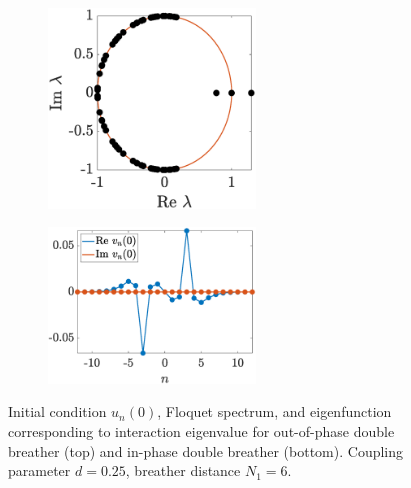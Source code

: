 \documentclass[12pt,reqno]{amsart}
\theoremstyle{definition}
\begin{document}
\begin{figure}
\begin{center}
\begin{subfigure}{0.3\linewidth}
		\label{fig:doubled}
	\end{subfigure}
	\begin{subfigure}{0.3\linewidth}
		\caption{}
		\includegraphics[width=5.5cm]{doubleppspec.eps} \hspace{-0.5cm}
		\label{fig:doublee}
	\end{subfigure}
	\begin{subfigure}{0.3\linewidth}
		\caption{}
		\includegraphics[width=5.5cm]{doubleppinteig.eps}
		\label{fig:doublef} 
	\end{subfigure}
	\end{center}
	\caption{Initial condition $u_n(0)$, Floquet spectrum, and eigenfunction corresponding to interaction eigenvalue for out-of-phase double breather (top) and in-phase double breather (bottom). Coupling parameter $d = 0.25$, breather distance $N_1 = 6$.}
	\label{fig:double}
\end{figure}
\end{document}

